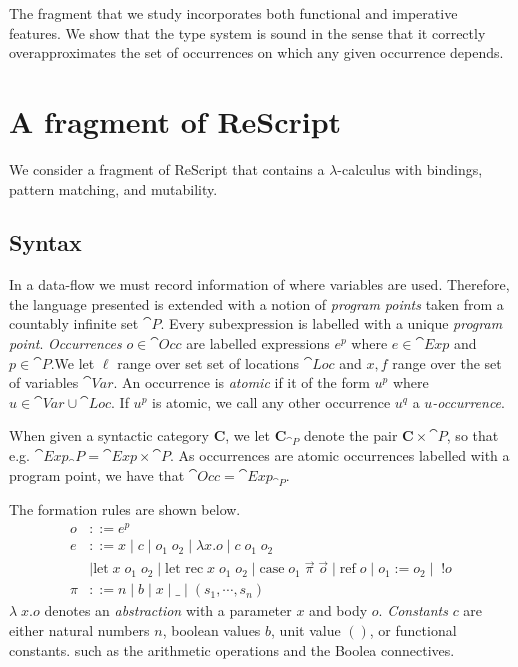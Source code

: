 \documentclass{llncs}
\newcommand{\refc}{\ensuremath{\textrm{ref}\xspace}}
\begin{document}
The fragment that we study incorporates both functional and imperative
features. We show that the type system is sound in the sense that
it correctly overapproximates the set of occurrences on which any
given occurrence depends.

\section{A fragment of ReScript}\label{sec:lang}

We consider a fragment of ReScript that contains a $\lambda$-calculus
with bindings, pattern matching, and mutability.
 
\subsection{Syntax}

In a data-flow we must record information of where variables are used.
Therefore, the language presented is extended with a notion of
\emph{program points} taken from a countably infinite set $\cat{P}$.
%
Every subexpression is labelled with a unique \emph{program
  point}. \emph{Occurrences} $o \in \cat{Occ}$ are labelled
expressions $e^p$ where $e \in \cat{Exp}$ and $p \in \cat{P}$.We let
$\ell$ range over set set of locations $\cat{Loc}$ and $x,f$ range
over the set of variables $\cat{Var}$.  An occurrence is \emph{atomic}
if it of the form $u^p$ where $u \in \cat{Var} \cup \cat{Loc}$. If
$u^p$ is atomic, we call any other occurrence $u^q$ a
\emph{$u$-occurrence}.

When given a syntactic category $\mathbf{C}$, we let $\mathbf{C}_{\cat{P}}$
denote the pair $\mathbf{C}\times\cat{P}$, so that e.g.
$\cat{Exp}_\cat{P}=\cat{Exp}\times\cat{P}$. 
As occurrences are atomic occurrences labelled with a program point, we have that $\cat{Occ}=\cat{Exp}_{\cat{P}}$.

The formation rules are shown below.
%
\begin{align*}
o &::= e^p \\
e &::= x \mid c \mid o_1\;o_2 \mid \lambda x.o \mid c \; o_1 \; o_2\\
			& \mid \mbox{let} \; x \; o_1 \; o_2 \mid
                   \mbox{let rec} \; x \; o_1 \; o_2 \mid \mbox{case}
                   \; o_1 \; \vec{\pi} \; \vec{o} \mid  \refc \; o \mid o_1 := o_2 \mid \; !o\\
\pi &::= n \mid b \mid x \mid \_  \mid
                                (s_1,\cdots,s_n)
\end{align*}
%
$\lambda\;x.o$ denotes an \emph{abstraction} with a parameter $x$ and body $o$.
\emph{Constants} $c$ are either natural numbers $n$, boolean values $b$, unit value $()$, or functional constants.
such as the arithmetic operations and the Boolea connectives.
\end{document}
